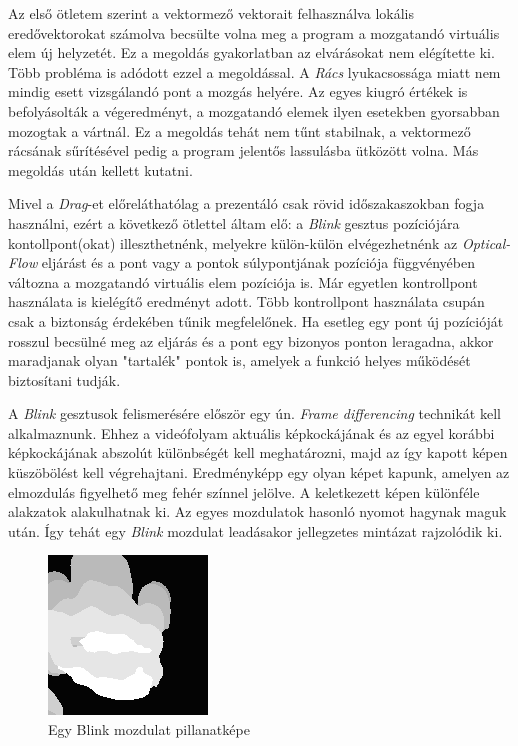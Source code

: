 Az első ötletem szerint a vektormező vektorait felhasználva lokális eredővektorokat számolva becsülte volna meg a program a mozgatandó virtuális elem új helyzetét. Ez a megoldás gyakorlatban az elvárásokat nem elégítette ki. Több probléma is adódott ezzel a megoldással. A \textit{Rács} lyukacsossága miatt nem mindig esett vizsgálandó pont a mozgás helyére. Az egyes kiugró értékek is befolyásolták a végeredményt, a mozgatandó elemek ilyen esetekben gyorsabban mozogtak a vártnál. Ez a megoldás tehát nem tűnt stabilnak, a vektormező rácsának sűrítésével pedig a program jelentős lassulásba ütközött volna. Más megoldás után kellett kutatni.

Mivel a \textit{Drag}-et előreláthatólag a prezentáló csak rövid időszakaszokban fogja használni, ezért a következő ötlettel áltam elő: a \textit{Blink} gesztus pozíciójára kontollpont(okat) illeszthetnénk, melyekre külön-külön elvégezhetnénk az \textit{Optical-Flow} eljárást és a pont vagy a pontok súlypontjának pozíciója függvényében változna a mozgatandó virtuális elem pozíciója is. Már egyetlen kontrollpont használata is kielégítő eredményt adott. Több kontrollpont használata csupán csak a biztonság érdekében tűnik megfelelőnek. Ha esetleg egy pont új pozícióját rosszul becsülné meg az eljárás és a pont egy bizonyos ponton leragadna, akkor maradjanak olyan "tartalék" pontok is, amelyek a funkció helyes működését biztosítani tudják.


A \textit{Blink} gesztusok felismerésére először egy ún. \textit{Frame differencing} technikát kell alkalmaznunk.
Ehhez a videófolyam aktuális képkockájának és az egyel korábbi képkockájának abszolút különbségét kell meghatározni, majd az így kapott képen küszöbölést kell végrehajtani. Eredményképp egy olyan képet kapunk, amelyen az elmozdulás figyelhető meg fehér színnel jelölve. A keletkezett képen különféle alakzatok alakulhatnak ki. Az egyes mozdulatok hasonló nyomot hagynak maguk után. Így tehát egy \textit{Blink} mozdulat leadásakor jellegzetes mintázat rajzolódik ki.

\begin{figure}[h]
\centering
\includegraphics[width=5truecm, height=5truecm]{images/Grab_screenshot.png}
\caption{Egy Blink mozdulat pillanatképe}
\label{fig:blink}
\end{figure}

